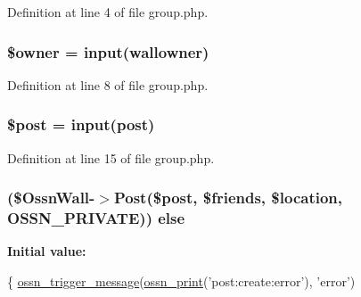 Definition at line 4 of file group.\+php.

\subsubsection[{\texorpdfstring{\$owner}{$owner}}]{\setlength{\rightskip}{0pt plus 5cm}\$owner = {\bf input}(\textquotesingle{}wallowner\textquotesingle{})}\hypertarget{_ossn_wall_2actions_2wall_2post_2group_8php_a9aabf46bdb166877480b2094d7ca01a7}{}\label{_ossn_wall_2actions_2wall_2post_2group_8php_a9aabf46bdb166877480b2094d7ca01a7}


Definition at line 8 of file group.\+php.

\subsubsection[{\texorpdfstring{\$post}{$post}}]{\setlength{\rightskip}{0pt plus 5cm}\$post = {\bf input}(\textquotesingle{}post\textquotesingle{})}\hypertarget{_ossn_wall_2actions_2wall_2post_2group_8php_a53d6c7669d97392c407c4f959a5263db}{}\label{_ossn_wall_2actions_2wall_2post_2group_8php_a53d6c7669d97392c407c4f959a5263db}


Definition at line 15 of file group.\+php.

\subsubsection[{\texorpdfstring{else}{else}}]{ (\${\bf Ossn\+Wall}-\/$>$Post(\$post, \$friends, \${\bf location}, {\bf O\+S\+S\+N\+\_\+\+P\+R\+I\+V\+A\+TE})) else}\hypertarget{_ossn_wall_2actions_2wall_2post_2group_8php_ae7f30c1564dcb7344463fc71e818e572}{}\label{_ossn_wall_2actions_2wall_2post_2group_8php_ae7f30c1564dcb7344463fc71e818e572}
{\bfseries Initial value\+:}
\begin{DoxyCode}
\{
    \hyperlink{ossn_8lib_8system_8php_ab3f23f23f32f50c12e7aea0ffaccaac7}{ossn\_trigger\_message}(\hyperlink{ossn_8lib_8languages_8php_a2be5d1c4b695593a9b9067b96df2150a}{ossn\_print}(\textcolor{stringliteral}{'post:create:error'}), \textcolor{stringliteral}{'error'})
\end{DoxyCode}


